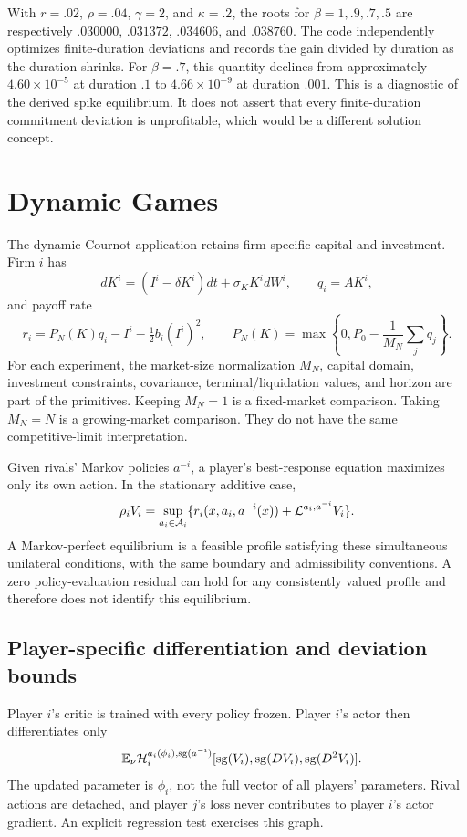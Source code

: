 With $r=.02$, $\rho=.04$, $\gamma=2$, and $\kappa=.2$, the roots for $\beta=1,.9,.7,.5$ are respectively $.030000$, $.031372$, $.034606$, and $.038760$. The code independently optimizes finite-duration deviations and records the gain divided by duration as the duration shrinks. For $\beta=.7$, this quantity declines from approximately $4.60\times10^{-5}$ at duration $.1$ to $4.66\times10^{-9}$ at duration $.001$. This is a diagnostic of the derived spike equilibrium. It does not assert that every finite-duration commitment deviation is unprofitable, which would be a different solution concept.

\section{Dynamic Games}\label{sec:games}
The dynamic Cournot application retains firm-specific capital and investment. Firm $i$ has
\[
 dK^i=(I^i-\delta K^i)dt+\sigma_K K^i dW^i,\qquad q_i=AK^i,
\]
and payoff rate
\[
 r_i=P_N(K)q_i-I^i-\tfrac12 b_i(I^i)^2,\qquad
 P_N(K)=\max\left\{0,P_0-\frac1{M_N}\sum_jq_j\right\}.
\]
For each experiment, the market-size normalization $M_N$, capital domain, investment constraints, covariance, terminal/liquidation values, and horizon are part of the primitives. Keeping $M_N=1$ is a fixed-market comparison. Taking $M_N=N$ is a growing-market comparison. They do not have the same competitive-limit interpretation.

Given rivals' Markov policies $a^{-i}$, a player's best-response equation maximizes only its own action. In the stationary additive case,
\begin{equation}\label{eq:game}
 \rho_i V_i=\sup_{a_i\in\mathcal A_i}\{r_i(x,a_i,a^{-i}(x))+\mathcal L^{a_i,a^{-i}}V_i\}.
\end{equation}
A Markov-perfect equilibrium is a feasible profile satisfying these simultaneous unilateral conditions, with the same boundary and admissibility conventions. A zero policy-evaluation residual can hold for any consistently valued profile and therefore does not identify this equilibrium.

\subsection{Player-specific differentiation and deviation bounds}
Player $i$'s critic is trained with every policy frozen. Player $i$'s actor then differentiates only
\begin{equation}\label{eq:gameactor}
 -\mathbb E_\nu\mathcal H_i^{a_i(\phi_i),\operatorname{sg}(a^{-i})}
       [\operatorname{sg}(V_i),\operatorname{sg}(DV_i),\operatorname{sg}(D^2V_i)].
\end{equation}
The updated parameter is $\phi_i$, not the full vector of all players' parameters. Rival actions are detached, and player $j$'s loss never contributes to player $i$'s actor gradient. An explicit regression test exercises this graph.

